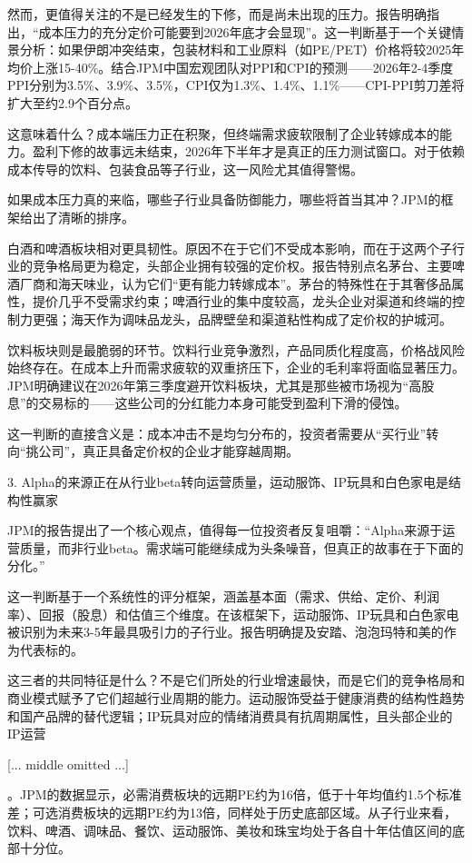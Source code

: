 \documentclass[11pt]{ctexart}
\begin{document}
然而，更值得关注的不是已经发生的下修，而是尚未出现的压力。报告明确指出，“成本压力的充分定价可能要到2026年底才会显现”。这一判断基于一个关键情景分析：如果伊朗冲突结束，包装材料和工业原料（如PE/PET）价格将较2025年均价上涨15-40\%。结合JPM中国宏观团队对PPI和CPI的预测——2026年2-4季度PPI分别为3.5\%、3.9\%、3.5\%，CPI仅为1.3\%、1.4\%、1.1\%——CPI-PPI剪刀差将扩大至约2.9个百分点。

这意味着什么？成本端压力正在积聚，但终端需求疲软限制了企业转嫁成本的能力。盈利下修的故事远未结束，2026年下半年才是真正的压力测试窗口。对于依赖成本传导的饮料、包装食品等子行业，这一风险尤其值得警惕。

如果成本压力真的来临，哪些子行业具备防御能力，哪些将首当其冲？JPM的框架给出了清晰的排序。

白酒和啤酒板块相对更具韧性。原因不在于它们不受成本影响，而在于这两个子行业的竞争格局更为稳定，头部企业拥有较强的定价权。报告特别点名茅台、主要啤酒厂商和海天味业，认为它们“更有能力转嫁成本”。茅台的特殊性在于其奢侈品属性，提价几乎不受需求约束；啤酒行业的集中度较高，龙头企业对渠道和终端的控制力更强；海天作为调味品龙头，品牌壁垒和渠道粘性构成了定价权的护城河。

饮料板块则是最脆弱的环节。饮料行业竞争激烈，产品同质化程度高，价格战风险始终存在。在成本上升而需求疲软的双重挤压下，企业的毛利率将面临显著压力。JPM明确建议在2026年第三季度避开饮料板块，尤其是那些被市场视为“高股息”的交易标的——这些公司的分红能力本身可能受到盈利下滑的侵蚀。

这一判断的直接含义是：成本冲击不是均匀分布的，投资者需要从“买行业”转向“挑公司”，真正具备定价权的企业才能穿越周期。

3. Alpha的来源正在从行业beta转向运营质量，运动服饰、IP玩具和白色家电是结构性赢家

JPM的报告提出了一个核心观点，值得每一位投资者反复咀嚼：“Alpha来源于运营质量，而非行业beta。需求端可能继续成为头条噪音，但真正的故事在于下面的分化。”

这一判断基于一个系统性的评分框架，涵盖基本面（需求、供给、定价、利润率）、回报（股息）和估值三个维度。在该框架下，运动服饰、IP玩具和白色家电被识别为未来3-5年最具吸引力的子行业。报告明确提及安踏、泡泡玛特和美的作为代表标的。

这三者的共同特征是什么？不是它们所处的行业增速最快，而是它们的竞争格局和商业模式赋予了它们超越行业周期的能力。运动服饰受益于健康消费的结构性趋势和国产品牌的替代逻辑；IP玩具对应的情绪消费具有抗周期属性，且头部企业的IP运营

[... middle omitted ...]

。JPM的数据显示，必需消费板块的远期PE约为16倍，低于十年均值约1.5个标准差；可选消费板块的远期PE约为13倍，同样处于历史底部区域。从子行业来看，饮料、啤酒、调味品、餐饮、运动服饰、美妆和珠宝均处于各自十年估值区间的底部十分位。
\end{document}
